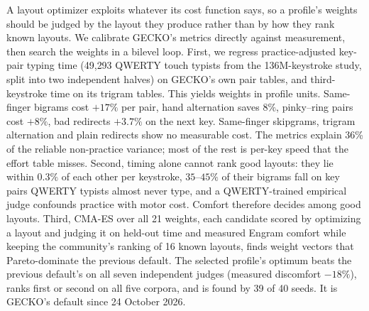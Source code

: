 \documentclass{gecko-paper}
\begin{document}
\makepapertitle
\begin{paperabstract}
A layout optimizer exploits whatever its cost function says, so a profile's weights should be judged by the layout they produce rather than by how they rank known layouts. We calibrate GECKO's metrics directly against measurement, then search the weights in a bilevel loop. First, we regress practice-adjusted key-pair typing time (49{,}293 QWERTY touch typists from the 136M-keystroke study, split into two independent halves) on GECKO's own pair tables, and third-keystroke time on its trigram tables. This yields weights in profile units. Same-finger bigrams cost $+17\%$ per pair, hand alternation saves $8\%$, pinky–ring pairs cost $+8\%$, bad redirects $+3.7\%$ on the next key. Same-finger skipgrams, trigram alternation and plain redirects show no measurable cost. The metrics explain 36\% of the reliable non-practice variance; most of the rest is per-key speed that the effort table misses. Second, timing alone cannot rank good layouts: they lie within $0.3\%$ of each other per keystroke, $35$–$45\%$ of their bigrams fall on key pairs QWERTY typists almost never type, and a QWERTY-trained empirical judge confounds practice with motor cost. Comfort therefore decides among good layouts. Third, CMA-ES over all 21 weights, each candidate scored by optimizing a layout and judging it on held-out time and measured Engram comfort while keeping the community's ranking of 16 known layouts, finds weight vectors that Pareto-dominate the previous default. The selected profile's optimum beats the previous default's on all seven independent judges (measured discomfort $-18\%$), ranks first or second on all five corpora, and is found by 39 of 40 seeds. It is GECKO's default since 24 October 2026.
\end{paperabstract}
\end{document}
